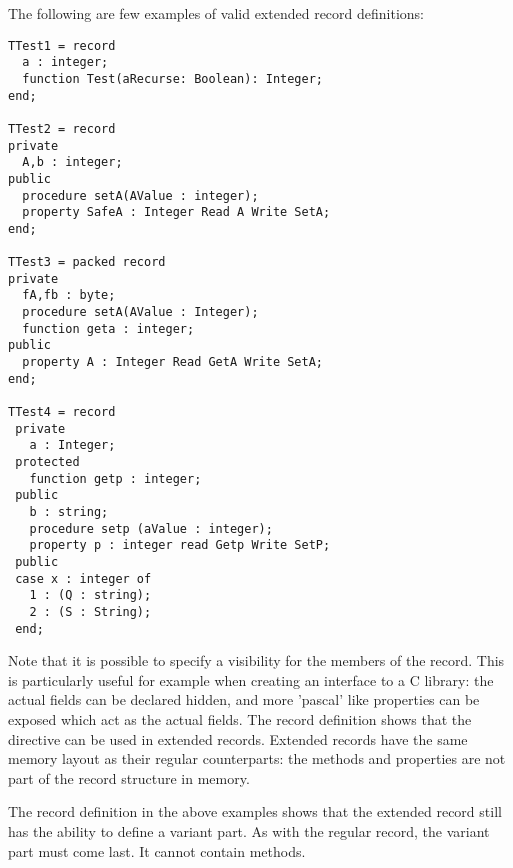 The following are few examples of valid extended record definitions:
\begin{verbatim}
TTest1 = record
  a : integer;
  function Test(aRecurse: Boolean): Integer;
end;

TTest2 = record
private
  A,b : integer;
public
  procedure setA(AValue : integer);
  property SafeA : Integer Read A Write SetA;
end;

TTest3 = packed record
private
  fA,fb : byte;
  procedure setA(AValue : Integer);
  function geta : integer;
public  
  property A : Integer Read GetA Write SetA;
end;

TTest4 = record
 private
   a : Integer;
 protected  
   function getp : integer; 
 public
   b : string;
   procedure setp (aValue : integer);
   property p : integer read Getp Write SetP;
 public  
 case x : integer of
   1 : (Q : string);
   2 : (S : String);
 end;
\end{verbatim}
Note that it is possible to specify a visibility for the members of the
record. This is particularly useful for example when creating an interface 
to a C library: the actual fields can be declared hidden, and more 'pascal'
like properties can be exposed which act as the actual fields. 
The  record definition shows that the  directive can
be used in extended records. Extended records have the same memory layout as
their regular counterparts: the methods and properties are not part of the
record structure in memory. 

The  record definition in the above examples shows that the
extended record still has the ability to define a variant part. As with the
regular record, the variant part must come last. It cannot contain methods.

